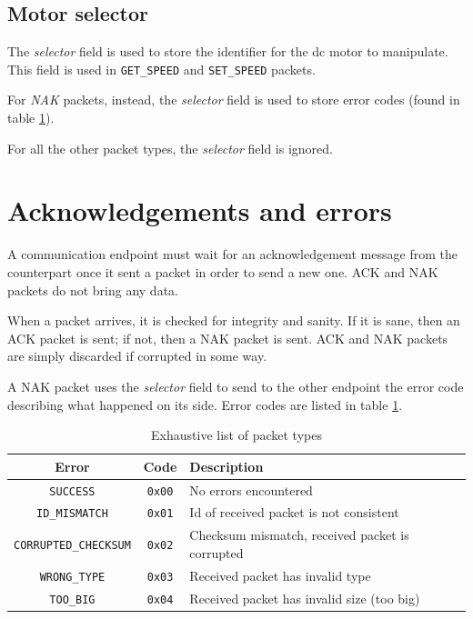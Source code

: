 \documentclass[binding=0.6cm,Lau]{sapthesis}
\begin{document}
\subsection{Motor selector}
The \emph{selector} field is used to store the identifier for the dc motor to
manipulate. This field is used in \texttt{GET\_SPEED} and \texttt{SET\_SPEED} packets.

For \emph{NAK} packets, instead, the \emph{selector} field is used to store
error codes (found in table \ref{tab:packet-error-codes}).

For all the other packet types, the \emph{selector} field is ignored.

\section{Acknowledgements and errors}
\label{client-master-comm-ackerr}
A communication endpoint must wait for an acknowledgement message from the
counterpart once it sent a packet in order to send a new one. ACK and NAK
packets do not bring any data.

When a packet arrives, it is checked for integrity and sanity. If it is sane,
then an ACK packet is sent; if not, then a NAK packet is sent.
ACK and NAK packets are simply discarded if corrupted in some way.

A NAK packet uses the \emph{selector} field to send to the other endpoint the
error code describing what happened on its side. Error codes are listed in
table \ref{tab:packet-error-codes}.

\begin{table}[bh]
  \begin{tabularx}{\textwidth}{c c X}
    \toprule
    Error & Code & Description \\
    \midrule
    \texttt{SUCCESS}             & \texttt{0x00} & No errors encountered \\
    \texttt{ID\_MISMATCH}        & \texttt{0x01} & Id of received packet is not consistent \\
    \texttt{CORRUPTED\_CHECKSUM} & \texttt{0x02} & Checksum mismatch, received packet is corrupted \\
    \texttt{WRONG\_TYPE}         & \texttt{0x03} & Received packet has invalid type \\
    \texttt{TOO\_BIG}            & \texttt{0x04} & Received packet has invalid size (too big) \\
    \bottomrule
  \end{tabularx}
  \caption{Exhaustive list of packet types}
  \label{tab:packet-error-codes}
\end{table}
\end{document}
